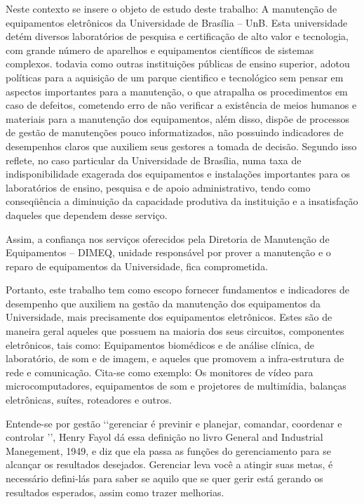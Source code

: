 Neste contexto se insere o objeto de estudo deste trabalho: A manutenção de equipamentos eletrônicos da Universidade de Brasília – UnB. Esta universidade detém diversos laboratórios de pesquisa e certificação de alto valor e tecnologia, com grande número de aparelhos e equipamentos científicos de sistemas complexos. todavia como outras instituições públicas de ensino superior, adotou políticas para a aquisição de um parque cientifico e tecnológico sem pensar em aspectos importantes para a manutenção, o que atrapalha os procedimentos em caso de defeitos, cometendo erro de não verificar a existência de meios humanos e materiais para a manutenção dos equipamentos, além disso, dispõe de processos de gestão de manutenções pouco informatizados, não possuindo indicadores de desempenhos claros que auxiliem seus gestores a tomada de decisão. Segundo \cite{limacastilho2006} isso reflete, no caso particular da Universidade de Brasília, numa taxa de indisponibilidade exagerada dos equipamentos e instalações importantes para os laboratórios de ensino, pesquisa e de apoio administrativo, tendo como conseqüência a diminuição da capacidade produtiva da instituição e a insatisfação daqueles que dependem desse serviço.

Assim, a confiança nos serviços oferecidos pela Diretoria de Manutenção de Equipamentos – DIMEQ, unidade responsável por prover a manutenção e o reparo de equipamentos da Universidade, fica comprometida. 

Portanto, este trabalho tem como escopo fornecer fundamentos e indicadores de desempenho que auxiliem na gestão da manutenção dos equipamentos da Universidade, mais precisamente dos equipamentos eletrônicos. Estes são de maneira geral aqueles que possuem na maioria dos seus circuitos, componentes eletrônicos, tais como: Equipamentos biomédicos e de análise clínica, de laboratório, de som e de imagem, e aqueles que promovem a infra-estrutura de rede e comunicação. Cita-se como exemplo: Os monitores de vídeo para microcomputadores, equipamentos de som e projetores de multimídia, balanças eletrônicas, suítes, roteadores e outros.

Entende-se por gestão \lq\lq gerenciar é previnir e planejar, comandar, coordenar e controlar \rq\rq, Henry Fayol dá essa definição no livro General and Industrial Manegement, 1949, e \cite{prasadgulshan2011} diz que ela passa as funções do gerenciamento para se alcançar os resultados desejados. Gerenciar leva você a atingir suas metas, é necessário defini-lás para saber se aquilo que se quer gerir está gerando os resultados esperados, assim como trazer melhorias.

